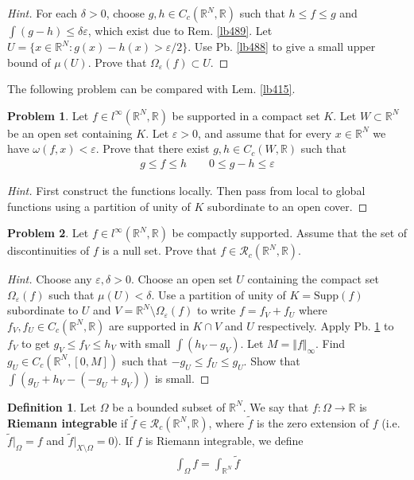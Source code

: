 \documentclass[12pt,b5paper,notitlepage]{article}
\theoremstyle{definition}
\newtheorem{df}{Definition}[section]
\newtheorem{prob}{\color{red}Problem}[section]
\theoremstyle{plain}
\newcommand{\wtd}{\widetilde}
\newcommand{\scr}{\mathscr}
\newcommand{\Rbb}{\mathbb R}
\newcommand{\Supp}{\mathrm{Supp}}
\newcommand{\eps}{\varepsilon}
\numberwithin{equation}{section}
\begin{document}
\begin{proof}[Hint]
For each $\delta>0$, choose $g,h\in C_c(\Rbb^N,\Rbb)$ such that $h\leq f\leq g$ and $\int(g-h)\leq\delta\eps$, which exist due to Rem. \ref{lb489}. Let $U=\{x\in\Rbb^N:g(x)-h(x)>\eps/2\}$. Use Pb. \ref{lb488} to give a small upper bound of $\mu(U)$. Prove that $\Omega_\eps(f)\subset U$.
\end{proof}


The following problem can be compared with Lem. \ref{lb415}.

\begin{prob}\label{lb491}
Let $f\in l^\infty(\Rbb^N,\Rbb)$ be supported in a compact set $K$. Let $W\subset\Rbb^N$ be an open set containing $K$. Let $\eps>0$, and assume that for every $x\in\Rbb^N$ we have $\omega(f,x)<\eps$. Prove that there exist $g,h\in C_c(W,\Rbb)$ such that
\begin{gather*}
g\leq f\leq h\qquad 0\leq g-h\leq\eps
\end{gather*}
\end{prob}

\begin{proof}[Hint]
First construct the functions locally. Then pass from local to global functions using a partition of unity of $K$ subordinate to an open cover.
\end{proof}


\begin{prob}\label{lb492}
Let $f\in l^\infty(\Rbb^N,\Rbb)$ be compactly supported. Assume that the set of discontinuities of $f$ is a null set. Prove that $f\in\scr R_c(\Rbb^N,\Rbb)$.
\end{prob}


\begin{proof}[Hint]
Choose any $\eps,\delta>0$. Choose an open set $U$ containing the compact set $\Omega_\eps(f)$ such that $\mu(U)<\delta$. Use a partition of unity of $K=\Supp(f)$ subordinate to $U$ and $V=\Rbb^N\setminus\Omega_\eps(f)$ to write $f=f_V+f_U$ where $f_V,f_U\in C_c(\Rbb^N,\Rbb)$ are supported in $K\cap V$ and $U$ respectively. Apply Pb. \ref{lb491} to $f_V$ to get $g_V\leq f_V\leq h_V$ with small $\int(h_V-g_V)$. Let $M=\Vert f\Vert_\infty$.  Find $g_U\in C_c(\Rbb^N,[0,M])$ such that $-g_U\leq f_U\leq g_U$. Show that $\int(g_U+h_V-(-g_U+g_V))$ is small.
\end{proof}



\begin{df}
Let $\Omega$ be a bounded subset of $\Rbb^N$. We say that $f:\Omega\rightarrow\Rbb$ is \textbf{Riemann integrable}  if $\wtd f\in\scr R_c(\Rbb^N,\Rbb)$, where $\wtd f$ is the zero extension of $f$ (i.e. $\wtd f|_\Omega=f$ and $\wtd f|_{X\setminus\Omega}=0$). If $f$ is Riemann integrable, we define
\begin{align*}
\int_\Omega f=\int_{\Rbb^N}\wtd f
\end{align*}
\end{df}
\end{document}
